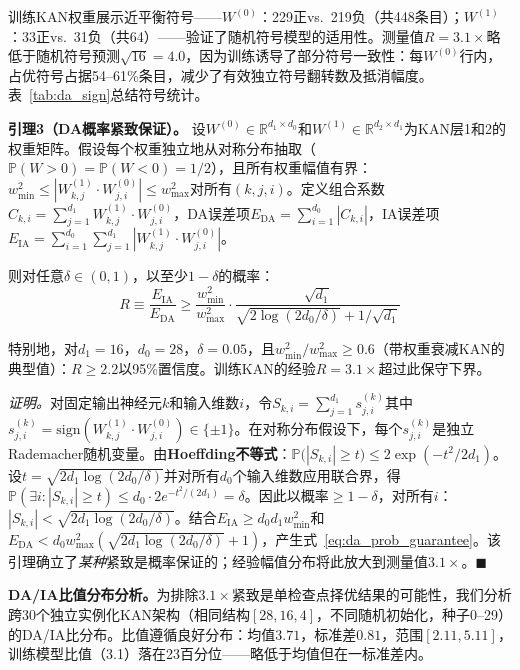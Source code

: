 \documentclass[journal,onecolumn]{IEEEtran}
\theoremstyle{definition}
\theoremstyle{plain}
\theoremstyle{remark}
\begin{document}
训练KAN权重展示近平衡符号——$W^{(0)}$：229正vs.\ 219负（共448条目）；$W^{(1)}$：33正vs.\ 31负（共64）——验证了随机符号模型的适用性。测量值$R=3.1\times$略低于随机符号预测$\sqrt{16}=4.0$，因为训练诱导了部分符号一致性：每$W^{(0)}$行内，占优符号占据54--61\%条目，减少了有效独立符号翻转数及抵消幅度。表~\ref{tab:da_sign}总结符号统计。

\vspace{4pt}
\noindent\textbf{引理3（DA概率紧致保证）。}
设$W^{(0)} \in \mathbb{R}^{d_1 \times d_0}$和$W^{(1)} \in \mathbb{R}^{d_2 \times d_1}$为KAN层1和2的权重矩阵。假设每个权重独立地从对称分布抽取（$\mathbb{P}(W > 0) = \mathbb{P}(W < 0) = 1/2$），且所有权重幅值有界：$w_{\min}^2 \leq |W^{(1)}_{k,j} \cdot W^{(0)}_{j,i}| \leq w_{\max}^2$对所有$(k,j,i)$。定义组合系数$C_{k,i} = \sum_{j=1}^{d_1} W^{(1)}_{k,j} \cdot W^{(0)}_{j,i}$，DA误差项$E_{\text{DA}} = \sum_{i=1}^{d_0} |C_{k,i}|$，IA误差项$E_{\text{IA}} = \sum_{i=1}^{d_0} \sum_{j=1}^{d_1} |W^{(1)}_{k,j} \cdot W^{(0)}_{j,i}|$。

则对任意$\delta \in (0,1)$，以至少$1-\delta$的概率：
\begin{equation}
R \equiv \frac{E_{\text{IA}}}{E_{\text{DA}}} \geq \frac{w_{\min}^2}{w_{\max}^2} \cdot \frac{\sqrt{d_1}}{\sqrt{2\log(2d_0/\delta)} + 1/\sqrt{d_1}}
\label{eq:da_prob_guarantee}
\end{equation}

特别地，对$d_1 = 16$，$d_0 = 28$，$\delta = 0.05$，且$w_{\min}^2/w_{\max}^2 \geq 0.6$（带权重衰减KAN的典型值）：$R \geq 2.2$以95\%置信度。训练KAN的经验$R = 3.1\times$超过此保守下界。

\vspace{2pt}
\noindent\textit{证明。}对固定输出神经元$k$和输入维数$i$，令$S_{k,i} = \sum_{j=1}^{d_1} s_{j,i}^{(k)}$其中$s_{j,i}^{(k)} = \text{sign}(W^{(1)}_{k,j} \cdot W^{(0)}_{j,i}) \in \{\pm 1\}$。在对称分布假设下，每个$s_{j,i}^{(k)}$是独立Rademacher随机变量。由\textbf{Hoeffding不等式}：$\mathbb{P}\bigl(|S_{k,i}| \geq t\bigr) \leq 2\exp(-t^2/2d_1)$。设$t = \sqrt{2d_1 \log(2d_0/\delta)}$并对所有$d_0$个输入维数应用联合界，得$\mathbb{P}(\exists i: |S_{k,i}| \geq t) \leq d_0 \cdot 2e^{-t^2/(2d_1)} = \delta$。因此以概率$\geq 1-\delta$，对所有$i$：$|S_{k,i}| < \sqrt{2d_1 \log(2d_0/\delta)}$。结合$E_{\text{IA}} \geq d_0 d_1 w_{\min}^2$和$E_{\text{DA}} < d_0 w_{\max}^2 (\sqrt{2d_1 \log(2d_0/\delta)} + 1)$，产生式~\ref{eq:da_prob_guarantee}。该引理确立了\textit{某种}紧致是概率保证的；经验幅值分布将此放大到测量值$3.1\times$。\hfill $\blacksquare$

\vspace{4pt}
\noindent\textbf{DA/IA比值分布分析。}为排除$3.1\times$紧致是单检查点择优结果的可能性，我们分析跨30个独立实例化KAN架构（相同结构$[28,16,4]$，不同随机初始化，种子0--29）的DA/IA比分布。比值遵循良好分布：均值$3.71$，标准差$0.81$，范围$[2.11, 5.11]$，训练模型比值（3.1）落在23百分位——略低于均值但在一标准差内。
\end{document}
